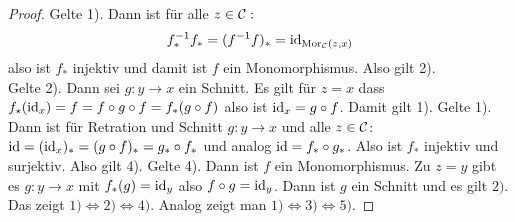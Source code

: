 \begin{proof}
    Gelte 1). Dann ist für alle \(z\in\mathcal{C}:\) \[f^{-1}_*f_*=(f^{-1}f)_*=\mathrm{id}_{\operatorname{Mor}_{\mathcal{C}}(z,x)}\] also ist \(f_*\) injektiv und damit ist \(f\) ein Monomorphismus. Also gilt 2).\\
    Gelte 2). Dann sei \(g\colon y\to x\) ein Schnitt.
    Es gilt für \(z=x\) dass \(f_\star (\mathrm{id}_x)=f=f\circ g\circ f=f_*(g\circ f)\) also ist \(\mathrm{id}_x=g\circ f\). Damit gilt 1).
    Gelte 1). Dann ist für Retration und Schnitt \(g\colon y\to x\) und alle \(z\in\mathcal{C}\):
    \(\mathrm{id}=(\mathrm{id}_x)_*=(g\circ f)_*=g_*\circ f_*\) und analog
    \(\mathrm{id}=f_*\circ g_*\). Also ist \(f_*\) injektiv und surjektiv. Also gilt 4).
    Gelte 4). Dann ist \(f\) ein Monomorphismus. Zu \(z=y\) gibt es \(g\colon y\to x\) mit \(f_*(g)=\mathrm{id}_y\) also \(f\circ g=\mathrm{id}_y\). Dann ist \(g\) ein Schnitt und es gilt \(2).\)
    Das zeigt \(1)\iff 2)\iff 4)\). Analog zeigt man \(1)\iff 3)\iff 5).\)
\end{proof}
